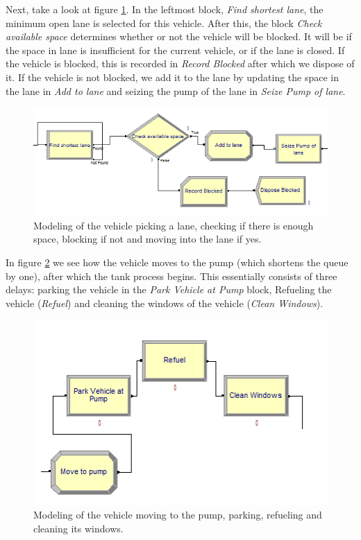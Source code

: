 Next, take a look at figure \ref{fig:picklane}. In the leftmost block, \textit{Find shortest lane}, the minimum open lane is selected for this vehicle. After this, the block \textit{Check available space} determines whether or not the vehicle will be blocked. It will be if the space in lane is insufficient for the current vehicle, or if the lane is closed. If the vehicle is blocked, this is recorded in \textit{Record Blocked} after which we dispose of it. If the vehicle is not blocked, we add it to the lane by updating the space in the lane in \textit{Add to lane} and seizing the pump of the lane in \textit{Seize Pump of lane}.

\begin{figure}[]
\begin{center}
	\includegraphics[scale=1]{images/model-description/pick-lane.PNG}
	\caption{Modeling of the vehicle picking a lane, checking if there is enough space, blocking if not and moving into the lane if yes.}
	\label{fig:picklane}
\end{center}
\end{figure}

In figure \ref{fig:refuelprocess} we see how the vehicle moves to the pump (which shortens the queue by one), after which the tank process begins. This essentially consists of three delays: parking the vehicle in the \textit{Park Vehicle at Pump} block, Refueling the vehicle (\textit{Refuel}) and cleaning the windows of the vehicle (\textit{Clean Windows}).

\begin{figure}[]
\begin{center}
	\includegraphics[scale=1]{images/model-description/refuel-process.PNG}
	\caption{Modeling of the vehicle moving to the pump, parking, refueling and cleaning its windows.}
	\label{fig:refuelprocess}
\end{center}
\end{figure}

